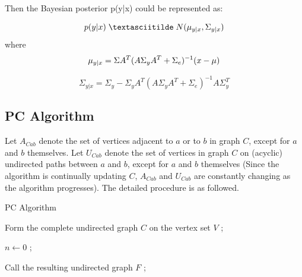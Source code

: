 \documentclass[12pt,a4paper]{article}
\theoremstyle{definition}
\begin{document}
\begin{appendix}
Then the Bayesian posterior p(y|x) could be represented as:

\begin{equation*}
	\centering
	p(y|x) \; \textasciitilde \; N(\mu_{y|x}, \Sigma_{y|x})
\end{equation*}
where
\begin{equation*}
	\centering
	\mu_{y|x} = \Sigma A^T(A\Sigma_yA^T+\Sigma_e)^{-1}(x-\mu)
\end{equation*}

\begin{equation*}
	\Sigma_{y|x} = \Sigma_y-\Sigma_yA^T(A\Sigma_yA^T+\Sigma_e)^{-1}A\Sigma_y^T
\end{equation*}

\subsection{PC Algorithm}
\label{apd:pc}

Let $A_{Cab}$ denote the set of vertices adjacent to $a$ or to $b$ in graph $C$, except for $a$ and $b$ themselves. Let $U_{Cab}$ denote the set of vertices in graph $C$ on (acyclic) undirected paths between $a$ and $b$, except for $a$ and $b$ themselves (Since the algorithm is continually updating $C$, $A_{Cab}$ and $U_{Cab}$ are constantly changing as the algorithm progresses). The detailed procedure is as followed.

\vspace{0.01\linewidth}
\begin{algorithm}[H]
	\caption{PC Algorithm \cite{pc-alg}}
	\label{alg:pc}
	\vspace{0.25\baselineskip}
	
	
	Form the complete undirected graph $C$ on the vertex set $V$ ;
	
	$n \leftarrow 0$ ;

	
	Call the resulting undirected graph $F$ ;
	

\end{algorithm}
\end{appendix}
\end{document}
